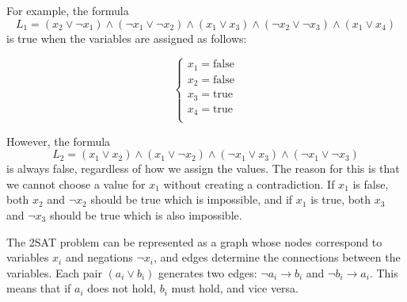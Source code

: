 For example, the formula
\[
    L_1 = (x_2 \lor \lnot x_1) \land
    (\lnot x_1 \lor \lnot x_2) \land
    (x_1 \lor x_3) \land
    (\lnot x_2 \lor \lnot x_3) \land
    (x_1 \lor x_4)
\]
is true when the variables are assigned as follows:

\[
    \begin{cases}
        x_1 = \textrm{false} \\
        x_2 = \textrm{false} \\
        x_3 = \textrm{true}  \\
        x_4 = \textrm{true}  \\
    \end{cases}
\]

However, the formula
\[
    L_2 = (x_1 \lor x_2) \land
    (x_1 \lor \lnot x_2) \land
    (\lnot x_1 \lor x_3) \land
    (\lnot x_1 \lor \lnot x_3)
\]
is always false, regardless of how we
assign the values.
The reason for this is that we cannot
choose a value for $x_1$
without creating a contradiction.
If $x_1$ is false, both $x_2$ and $\lnot x_2$
should be true which is impossible,
and if $x_1$ is true, both $x_3$ and $\lnot x_3$
should be true which is also impossible.

The 2SAT problem can be represented as a graph
whose nodes correspond to
variables $x_i$ and negations $\lnot x_i$,
and edges determine the connections
between the variables.
Each pair $(a_i \lor b_i)$ generates two edges:
$\lnot a_i \to b_i$ and $\lnot b_i \to a_i$.
This means that if $a_i$ does not hold,
$b_i$ must hold, and vice versa.

